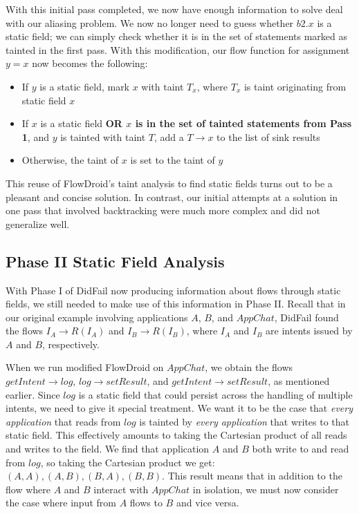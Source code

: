 With this initial pass completed, we now have enough information to solve deal with our aliasing problem. We now no longer need to guess whether $b2.x$ is a static field; we can simply check whether it is in the set of statements marked as tainted in the first pass. With this modification, our flow function for assignment $y = x$ now becomes the following:

\begin{itemize}
\item If $y$ is a static field, mark $x$ with taint $T_x$, where $T_x$ is taint originating from static field $x$
\item If $x$ is a static field \textbf{OR $x$ is in the set of tainted statements from Pass 1}, and $y$ is tainted with taint $T$, add a $T\rightarrow x$ to the list of sink results
\item Otherwise, the taint of $x$ is set to the taint of $y$
\end{itemize}

This reuse of FlowDroid's taint analysis to find static fields turns out to be a pleasant and concise solution. In contrast, our initial attempts at a solution in one pass that involved backtracking were much more complex and did not generalize well.

\subsection{Phase II Static Field Analysis}
\label{sec:staticphase2}

With Phase I of DidFail now producing information about flows through static fields, we still needed to make use of this information in Phase II. Recall that in our original example involving applications $A$, $B$, and $AppChat$, DidFail found the flows $I_A\rightarrow R(I_A)$ and $I_B\rightarrow R(I_B)$, where $I_A$ and $I_B$ are intents issued by $A$ and $B$, respectively. 

When we run modified FlowDroid on $AppChat$, we obtain the flows $getIntent\rightarrow log$, $log\rightarrow setResult$, and $getIntent\rightarrow setResult$, as mentioned earlier. Since $log$ is a static field that could persist across the handling of multiple intents, we need to give it special treatment. We want it to be the case that \emph{every application} that reads from $log$ is tainted by \emph{every application} that writes to that static field. This effectively amounts to taking the Cartesian product of all reads and writes to the field. We find that application $A$ and $B$ both write to and read from $log$, so taking the Cartesian product we get: $(A, A), (A, B), (B, A), (B, B)$. This result means that in addition to the flow where $A$ and $B$ interact with $AppChat$ in isolation, we must now consider the case where input from $A$ flows to $B$ and vice versa.

